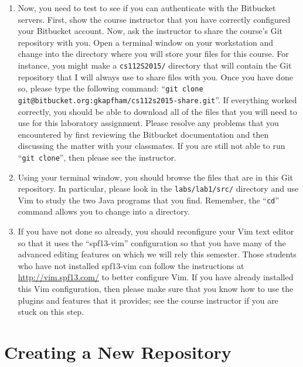 \begin{enumerate}
  \item Now, you need to test to see if you can authenticate with the Bitbucket servers.  First, show the course
    instructor that you have correctly configured your Bitbucket account.  Now, ask the instructor to share the course's
    Git repository with you.  Open a terminal window on your workstation and change into the directory where you will
    store your files for this course.  For instance, you might make a {\tt cs112S2015/} directory that will contain the
    Git repository that I will always use to share files with you.  Once you have done so, please type the following
    command: ``{\tt git clone git@bitbucket.org:gkapfham/cs112s2015-share.git}''.  If everything worked correctly, you
    should be able to download all of the files that you will need to use for this laboratory assignment. Please resolve
    any problems that you encountered by first reviewing the Bitbucket documentation and then discussing the matter
    with your classmates. If you are still not able to run ``{\tt git clone}'', then please see the instructor.

  \item Using your terminal window, you should browse the files that are in this Git repository.  In particular, please
    look in the {\tt labs/lab1/src/} directory and use Vim to study the two Java programs that you find.  Remember, the
    ``{\tt cd}'' command allows you to change into a directory.

  \item If you have not done so already, you should reconfigure your Vim text editor so that it uses the ``spf13-vim''
    configuration so that you have many of the advanced editing features on which we will rely this semester. Those
    students who have not installed spf13-vim can follow the instructions at \url{http://vim.spf13.com/} to better
    configure Vim. If you have already installed this Vim configuration, then please make sure that you know how to use
    the plugins and features that it provides; see the course instructor if you are stuck on this step.

\end{enumerate}

\section*{Creating a New Repository}

